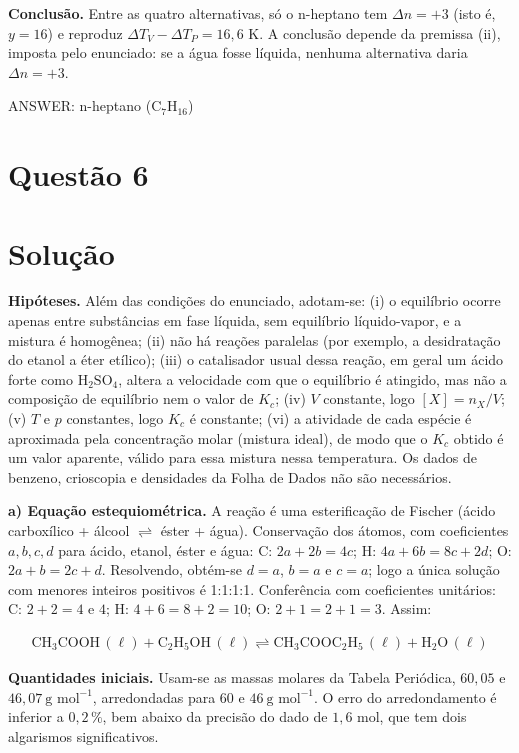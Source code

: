 \documentclass{article}%
\begin{document}
\textbf{Conclusão.} Entre as quatro alternativas, só o n-heptano tem $\Delta n=+3$ (isto é, $y=16$) e reproduz $\Delta T_V-\Delta T_P=16{,}6$ K. A conclusão depende da premissa (ii), imposta pelo enunciado: se a água fosse líquida, nenhuma alternativa daria $\Delta n=+3$.

ANSWER: n-heptano ($\text{C}_7\text{H}_{16}$)%
\newpage%
\section*{Questão 6}

\section*{Solução}

\textbf{Hipóteses.} Além das condições do enunciado, adotam-se: (i) o equilíbrio ocorre apenas entre substâncias em fase líquida, sem equilíbrio líquido-vapor, e a mistura é homogênea; (ii) não há reações paralelas (por exemplo, a desidratação do etanol a éter etílico); (iii) o catalisador usual dessa reação, em geral um ácido forte como $\mathrm{H_2SO_4}$, altera a velocidade com que o equilíbrio é atingido, mas não a composição de equilíbrio nem o valor de $K_c$; (iv) $V$ constante, logo $[X]=n_X/V$; (v) $T$ e $p$ constantes, logo $K_c$ é constante; (vi) a atividade de cada espécie é aproximada pela concentração molar (mistura ideal), de modo que o $K_c$ obtido é um valor aparente, válido para essa mistura nessa temperatura. Os dados de benzeno, crioscopia e densidades da Folha de Dados não são necessários.

\textbf{a) Equação estequiométrica.} A reação é uma esterificação de Fischer (ácido carboxílico + álcool $\rightleftharpoons$ éster + água). Conservação dos átomos, com coeficientes $a,b,c,d$ para ácido, etanol, éster e água: C: $2a+2b=4c$; H: $4a+6b=8c+2d$; O: $2a+b=2c+d$. Resolvendo, obtém-se $d=a$, $b=a$ e $c=a$; logo a única solução com menores inteiros positivos é 1:1:1:1. Conferência com coeficientes unitários: C: $2+2=4$ e $4$; H: $4+6=8+2=10$; O: $2+1=2+1=3$. Assim:

\begin{align*}
\mathrm{CH_3COOH}\,(\ell) + \mathrm{C_2H_5OH}\,(\ell) \rightleftharpoons \mathrm{CH_3COOC_2H_5}\,(\ell) + \mathrm{H_2O}\,(\ell)
\end{align*}

\textbf{Quantidades iniciais.} Usam-se as massas molares da Tabela Periódica, $60{,}05$ e $46{,}07\ \text{g mol}^{-1}$, arredondadas para $60$ e $46\ \text{g mol}^{-1}$. O erro do arredondamento é inferior a $0{,}2\,\%$, bem abaixo da precisão do dado de $1{,}6$ mol, que tem dois algarismos significativos.
\end{document}
